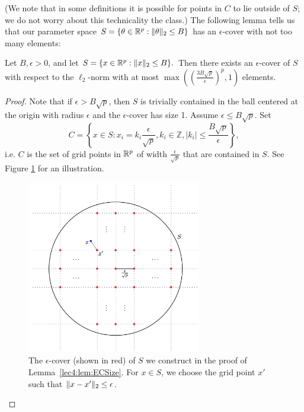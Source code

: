 (We note that in some definitions it is possible for points in $C$ to lie outside of $S$; we do not worry about this technicality the class.) The following lemma tells us that our parameter space $S = \{\theta \in \mathbb R^p: \|\theta\|_2 \le B\}$ has an $\epsilon$-cover with not too many elements:

\begin{lemma}\label{lec4:lem:ECSize}
Let $B,\epsilon>0$, and let $S = \{x \in \mathbb R^p: \|x\|_2 \le B\}.$ Then there exists an $\epsilon$-cover of $S$ with respect to the $\ell_2$-norm with at most $\max \left (\left(\frac{3B\sqrt{p}}{\epsilon}\right)^p, 1 \right)$  elements.
\end{lemma}

\begin{proof}
Note that if $\epsilon > B\sqrt{p}$, then $S$ is trivially contained in the ball centered at the origin with radius $\epsilon$ and the $\epsilon$-cover has size 1. Assume $\epsilon \leq B \sqrt{p}$. Set
\begin{equation}
C = \left\{ x \in S: x_i = k_i \frac{\epsilon}{\sqrt{p}}, k_i \in \mathbb{Z}, |k_i| \leq  \frac{B\sqrt{p}}{\epsilon}  \right\},
\end{equation}
i.e. $C$ is the set of grid points in $\mathbb R^p$ of width $\tfrac{\epsilon}{\sqrt{p}}$ that are contained in $S$. See Figure \ref{lec5:fig:ecover} for an illustration. 
\begin{figure}[ht]
\centerline{\includegraphics[width=3in]{figures/ECover.png}}
\caption[lec5:fig:ecover]{The $\epsilon$-cover (shown in red) of $S$ we construct in the proof of Lemma~\ref{lec4:lem:ECSize}. For $x \in S$, we choose the grid point $x'$ such that $\|x-x'\|_2 \le \epsilon$.}
\label{lec5:fig:ecover}
\end{figure}


\end{proof}
